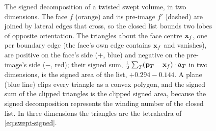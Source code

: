 \begin{figure}[htbp]
\caption{The signed decomposition of a twisted swept volume, in two dimensions. The face $f$ (orange) and its pre-image $f'$ (dashed) are joined by lateral edges that cross, so the closed list bounds two lobes of opposite orientation. The triangles about the face centre $\mathbf{x}_f$, one per boundary edge (the face's own edge contains $\mathbf{x}_f$ and vanishes), are positive on the face's side ($+$, blue) and negative on the pre-image's side ($-$, red); their signed sum, $\tfrac12\sum_T (\mathbf{p}_T - \mathbf{x}_f)\cdot\mathbf{a}_T$ in two dimensions, is the signed area of the list, $+0.294 - 0.144$. A plane (blue line) clips every triangle as a convex polygon, and the signed sum of the clipped triangles is the clipped signed area, because the signed decomposition represents the winding number of the closed list. In three dimensions the triangles are the tetrahedra of \cref{eq:swept-signed}.}
\label{fig:signedtets}
\end{figure}
